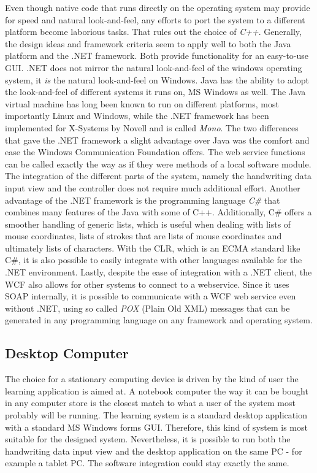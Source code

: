 Even though native code that runs directly on the operating system may 
provide for speed and natural look-and-feel, any efforts to port the system
to a different platform become laborious tasks. That rules out the choice of
\emph{C++}.
Generally, the design ideas and framework criteria seem to apply well to both 
the Java platform and the .NET framework. Both provide functionality for an 
easy-to-use GUI. .NET does not mirror the natural look-and-feel of the windows
operating system, it \emph{is} the natural look-and-feel on Windows.
Java has the ability to adopt the look-and-feel of different systems it runs on,
MS Windows as well. The Java virtual machine has long been known to run on 
different platforms, most importantly Linux and Windows, 
while the .NET framework has been implemented for X-Systems by Novell and is 
called \emph{Mono}.
The two differences that gave the .NET framework a slight advantage over Java 
was the comfort and ease the Windows Communication Foundation offers.
The web service functions can be called exactly the way as if they were methods 
of a local software module. The integration of the different parts of the system,
namely the handwriting data input view and the controller does not require much
additional effort. Another advantage of the .NET framework is the programming
language \emph{C\#} that combines many features of the Java with some of C++.
Additionally, C\# offers a smoother handling of generic lists, which is useful
when dealing with lists of mouse coordinates, lists of strokes that are lists
of mouse coordinates and ultimately lists of characters.
With the CLR, which is an ECMA standard like C\#, it is also possible to easily 
integrate with other languages available for the .NET environment.
Lastly, despite the ease of integration with a .NET client, the WCF also allows 
for other systems to connect to a webservice. Since it uses SOAP internally, 
it is possible to communicate with a WCF web service even without .NET, using
so called \emph{POX} (Plain Old XML) messages that can be generated in any
programming language on any framework and operating system.

\subsection{Desktop Computer}
\label{sec:desktopcomputer}

The choice for a stationary computing device is driven by the kind of user
the learning application is aimed at. A notebook computer the way it can be 
bought in any computer store is the closest match to what a user of the system  
most probably will be running. 
The learning system is a standard desktop application with a standard 
MS Windows forms GUI. Therefore, this kind of system is most suitable for the
designed system.
Nevertheless, it is possible to run both the handwriting data input view and
the desktop application on the same PC - for example a tablet PC.
The software integration could stay exactly the same.

